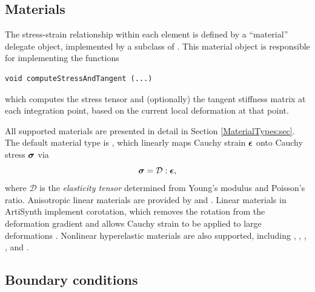 \subsection{Materials}
\label{sec:fem:materials}

The stress-strain relationship within each element is defined by a ``material''
delegate object, implemented by a subclass of 
.  This material object is 
responsible for implementing the functions
%
\begin{lstlisting}[]
   void computeStressAndTangent (...)
\end{lstlisting}
%
which computes the stress tensor and (optionally) the tangent stiffness
matrix at each integration point, based on the current local
deformation at that point.

All supported materials are presented in detail in Section
\ref{MaterialTypes:sec}. The default material type is
, which
linearly maps Cauchy strain $\boldsymbol\epsilon$ onto Cauchy stress $\boldsymbol\sigma$ via
%
\begin{equation*}
\boldsymbol\sigma = \mathcal{D} : \boldsymbol\epsilon,
\end{equation*}
%
where $\mathcal{D}$ is the {\it elasticity tensor} determined
from Young's modulus and Poisson's ratio. Anisotropic
linear materials are provided by
and
.
Linear materials in ArtiSynth implement corotation, which removes the
rotation from the deformation gradient and allows Cauchy strain to be
applied to large
deformations \cite{ngan:fem:2008,muller2004interactive}.  Nonlinear
hyperelastic materials are also supported, including
,
,
,
,
and
.

\subsection{Boundary conditions}
\label{sec:fem:boundary}

